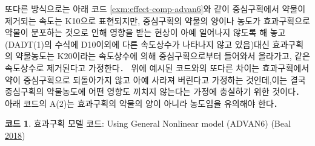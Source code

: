 \documentclass[
  10pt,
  krantz2,
  a4paper]{krantz}
\theoremstyle{definition}
\theoremstyle{definition}
\newtheorem{example}{코드}[chapter]
\theoremstyle{definition}
\theoremstyle{remark}
\begin{document}
또다른 방식으로는 아래 코드 \ref{exm:effect-comp-advan6}와 같이 중심구획에서 약물이 제거되는 속도는 K10으로 표현되지만, 중심구획의 약물의 양이나 농도가 효과구획으로 약물이 분포하는 것으로 인해 영향을 받는 현상이 아예 일어나지 않도록 해 놓고(DADT(1)의 수식에 D10이외에 다른 속도상수가 나타나지 않고 있음)대신 효과구획의 약물농도는 K20이라는 속도상수에 의해 중심구획으로부터 들어와서 올라가고, 같은 속도상수로 제거된다고 가정한다． 위에 예시된 코드와의 또다른 차이는 효과구획에서 약이 중심구획으로 되돌아가지 않고 아예 사라져 버린다고 가정하는 것인데,이는 결국 중심구획의 약물농도에 어떤 영향도 끼치지 않는다는 가정에 충실하기 위한 것이다． 아래 코드의 A(2)는 효과구획의 약물의 양이 아니라 농도임을 유의해야 한다．

\begin{example}
\protect\hypertarget{exm:effect-comp-advan6}{}{\label{exm:effect-comp-advan6} }효과구획 모델 코드: Using General Nonlinear model (ADVAN6) (Beal \protect\hyperlink{ref-nonmem}{2018})
\end{example}
\end{document}
